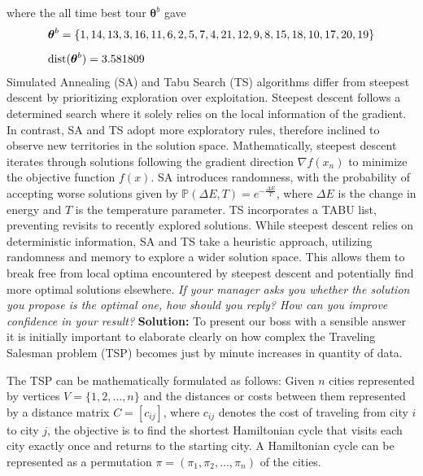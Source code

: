 where the all time best tour $\boldsymbol{\theta}^{b}$ gave
\begin{align*}
    &\boldsymbol{\theta}^{b} = \left\{ 1, 14, 13, 3, 16, 11, 6, 2, 5, 7, 4, 21, 12, 9, 8, 15, 18, 10, 17, 20, 19 \right\} \\[5pt] 
    &\text{dist}( \boldsymbol{\theta}^{b}) =   3.581809 
\end{align*}
Simulated Annealing (SA) and Tabu Search (TS) algorithms differ from steepest descent by prioritizing exploration over exploitation. Steepest descent follows a determined search where it solely relies on the local information of the gradient. In contrast, SA and TS adopt more exploratory rules, therefore inclined to observe new territories in the solution space. \spaze
Mathematically, steepest descent iterates through solutions following the gradient direction  \( \nabla f(x_n) \) to minimize the objective function \( f(x) \). SA introduces randomness, with the probability of accepting worse solutions given by \( \mathbb{P}(\Delta E, T) = e^{-\frac{\Delta E}{T}} \), where \( \Delta E \) is the change in energy and \( T \) is the temperature parameter. TS incorporates a TABU list, preventing revisits to recently explored solutions. \spaze
While steepest descent relies on deterministic information, SA and TS take a heuristic approach, utilizing randomness and memory to explore a wider solution space. This allows them to break free from local optima encountered by steepest descent and potentially find more optimal solutions elsewhere.
\emph{If your manager asks you whether the solution you propose is the optimal one, how
should you reply? How can you improve confidence in your result?}  \spaze
\textbf{Solution:} \spaze
To present our boss with a sensible answer it is initially important to elaborate clearly on how complex the Traveling Salesman problem (TSP) becomes just by minute increases in quantity of data. 

The TSP can be mathematically formulated as follows: Given \( n \) cities represented by vertices \( V = \{1, 2, \ldots, n\} \) and the distances or costs between them represented by a distance matrix \( C = [c_{ij}] \), where \( c_{ij} \) denotes the cost of traveling from city \( i \) to city \( j \), the objective is to find the shortest Hamiltonian cycle that visits each city exactly once and returns to the starting city. A Hamiltonian cycle can be represented as a permutation \( \pi = (\pi_1, \pi_2, \ldots, \pi_n) \) of the cities.

